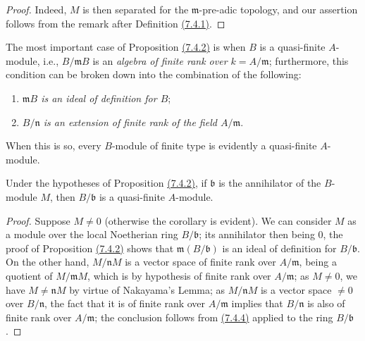 \begin{proof}
\label{proof-0.7.4.3}
Indeed, $M$ is then separated for the $\mathfrak{m}$-pre-adic topology, and our assertion
follows from the remark after Definition \hyperref[0.7.4.1]{(7.4.1)}.
\end{proof}

\begin{env}[7.4.4]
\label{0.7.4.4}
The most important case of Proposition \hyperref[0.7.4.2]{(7.4.2)} is when $B$ is a
quasi-finite $A$-module, i.e., $B/\mathfrak{m}B$ is an {\em algebra of finite rank over
$k=A/\mathfrak{m}$}; furthermore, this condition can be broken down into the combination
of the following:
\begin{enumerate}[label=(\roman*)]
  \item {\em $\mathfrak{m}B$ is an ideal of definition for $B$};
  \item {\em $B/\mathfrak{n}$ is an extension of finite rank of the field $A/\mathfrak{m}$}.
\end{enumerate}
When this is so, every $B$-module of finite type is evidently a quasi-finite $A$-module.
\end{env}

\begin{cor}[7.4.5]
\label{0.7.4.5}
Under the hypotheses of Proposition \hyperref[0.7.4.2]{(7.4.2)}, if
$\mathfrak{b}$ is the annihilator of the $B$-module $M$, then $B/\mathfrak{b}$ is a
quasi-finite $A$-module.
\end{cor}

\begin{proof}
\label{proof-0.7.4.5}
Suppose $M\neq 0$ (otherwise the corollary is evident). We can consider $M$ as a
module over the local Noetherian ring $B/\mathfrak{b}$; its annihilator then being
$0$, the proof of Proposition \hyperref[0.7.4.2]{(7.4.2)} shows that
$\mathfrak{m}(B/\mathfrak{b})$ is an ideal of definition for $B/\mathfrak{b}$.
On the other hand, $M/\mathfrak{n}M$ is a vector space of finite rank over
$A/\mathfrak{m}$, being a quotient of $M/\mathfrak{m}M$, which is by hypothesis of
finite rank over $A/\mathfrak{m}$; as $M\neq 0$, we have $M\neq\mathfrak{n}M$ by
virtue of Nakayama's Lemma; as $M/\mathfrak{n}M$ is a vector space $\neq 0$ over
$B/\mathfrak{n}$, the fact that it is of finite rank over $A/\mathfrak{m}$ implies
that $B/\mathfrak{n}$ is also of finite rank over $A/\mathfrak{m}$; the conclusion
follows from \hyperref[0.7.4.4]{(7.4.4)} applied to the ring $B/\mathfrak{b}$.
\end{proof}

